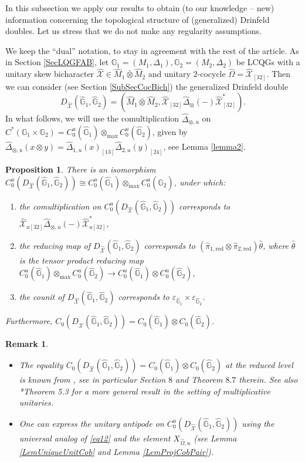 \documentclass[reqno]{amsart}
\numberwithin{equation}{section}
\newtheorem{Prop}[Theorem]{Proposition}
\newtheorem{Rem}[Theorem]{Remark}
\newcommand{\G}{\mathbb{G}}
\newcommand{\red}{\mathrm{red}}
\newcommand{\mc}{\mathcal}
\newcommand{\eps}{\varepsilon}
\newcommand{\wh}{\widehat}
\begin{document}
In this subsection we apply our results to obtain (to our knowledge -- new) information concerning the topological structure of (generalized) Drinfeld doubles. Let us stress that we do not make any regularity assumptions.

We keep the ``dual'' notation, to stay in agreement with the rest of the article. As in Section \ref{SecLQGFAB}, let $\G_1=(M_1,\Delta_1),\G_2=(M_2,\Delta_2)$ be LCQGs with a unitary skew bicharacter $\wh{\mc{X}}\in \hat{M}_1\bar{\otimes} \hat{M}_2$ and unitary $2$-cocycle $\hat{\Omega}=\wh{\mc{X}}_{[32]}$. Then we can consider (see Section \ref{SubSecCocBich}) the  generalized Drinfeld double
\[
D_{\wh{\mc{X}}}(\hat{\G}_1,\hat{\G}_2)=
(\hat{M}_1\bar\otimes \hat{M}_2, 
\wh{\mc{X}}_{[32]} \hat{\Delta}_{\otimes} (-)
\wh{\mc{X}}_{[32]}^*).
\]
In what follows, we will use the comultiplication $\hat{\Delta}_{\otimes,u}$ on $C^*(\G_1\times \G_2)=C_0^u(\hat{\G}_1)\otimes_{\max}C_0^u(\hat{\G}_2)$, given by $\hat{\Delta}_{\otimes,u}(x\otimes y)=\hat{\Delta}_{1,u}(x)_{[13]}\hat{\Delta}_{2,u}(y)_{[24]}$, see Lemma \ref{lemma2}.

\begin{Prop}\label{prop3}
There is an isomorphism $C_0^u( D_{\wh{\mc{X}}}(\hat{\G}_1,\hat{\G}_2) )\cong C^u_0(\hat{\G}_1)\otimes_{\max} C^u_0(\hat{\G}_2)$, under which:
\begin{enumerate}
\item the comultiplication on $C_0^u( D_{\wh{\mc{X}}}(\hat{\G}_1,\hat{\G}_2) )$ corresponds to $\wh{\mc{X}}_{u[32]} \hat{\Delta}_{\otimes,u}(-) \wh{\mc{X}}_{u[32]}^*$,
\item the reducing map of $D_{\wh{\mc{X}}}(\hat{\G}_1,\hat{\G}_2)$ corresponds to $(\hat{\pi}_{1,\red}\otimes\hat{\pi}_{2,\red})\hat{\theta}$, where $\hat{\theta}$ is the tensor product reducing map $C^u_0(\hat{\G}_1)\otimes_{\max} C^u_0(\hat{\G}_2)\rightarrow C^u_0(\hat{\G}_1)\otimes C^u_0(\hat{\G}_2)$,
\item the counit of $D_{\wh{\mc{X}}}(\hat{\G}_1,\hat{\G}_2)$ corresponds to $\eps_{\hat{\G}_1}\times \eps_{\hat{\G}_2}$.
\end{enumerate}
Furthermore, $C_0 (D_{\wh{\mc{X}}}(\hat{\G}_1,\hat{\G}_2))=C_{0}(\hat{\G}_1)\otimes C_{0}(\hat{\G}_2)$.
\end{Prop}

\begin{Rem}\noindent
\begin{itemize}
\item The equality $C_0 (D_{\wh{\mc{X}}}(\hat{\G}_1,\hat{\G}_2))=C_{0}(\hat{\G}_1)\otimes C_{0}(\hat{\G}_2)$ at the reduced level is known from  \cite{MNW03}, see in particular Section $8$ and Theorem $8.7$ therein. See also \cite{Roy15}*{Theorem 5.3} for a more general result in the setting of multiplicative unitaries.
\item One can express the unitary antipode on $C_0^u(D_{\wh{\mc{X}}}(\hat{\G}_1,\hat{\G}_2))$ using the universal analog of \eqref{eq12} and the element $X_{\hat{\Omega},u}$ (see Lemma \ref{LemUniqueUnitCob} and Lemma \ref{LemProjCobPair}).
\end{itemize}
\end{Rem}
\end{document}
